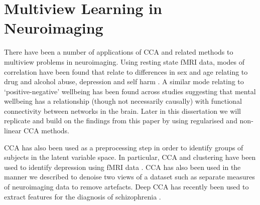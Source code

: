 \section{Multiview Learning in Neuroimaging}

There have been a number of applications of CCA and related methods to multiview problems in neuroimaging.
Using resting state fMRI data, modes of correlation have been found that relate to differences in sex and age relating to drug and alcohol abuse, depression and self harm \cite{mihalik2019brain}.
A similar mode relating to `positive-negative' wellbeing has been found across studies \cite{smith2015positive} suggesting that mental wellbeing has a relationship (though not necessarily causally) with functional connectivity between networks in the brain.
Later in this dissertation we will replicate and build on the findings from this paper by using regularised and non-linear CCA methods.

CCA has also been used as a preprocessing step in order to identify groups of subjects in the latent variable space.
In particular, CCA and clustering have been used to identify depression using fMRI data \cite{dinga2019evaluating} \cite{drysdale2017resting}.
CCA has also been used in the manner we described to denoise two views of a dataset such as separate measures of neuroimaging data \cite{zhuang2020technical} to remove artefacts.
Deep CCA has recently been used to extract features for the diagnosis of schizophrenia \cite{qi2016deep}.






